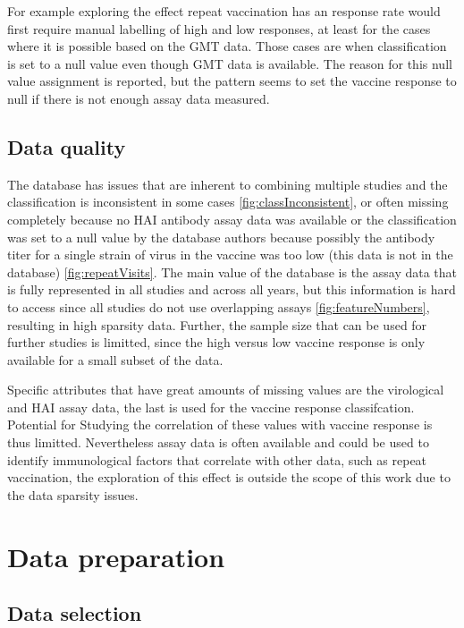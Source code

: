 For example exploring the effect repeat vaccination has an response rate would
first require manual labelling of high and low responses, at least for the
cases where it is possible based on the GMT data. Those cases are when
classification is set to a null value even though GMT data is available.  The
reason for this null value assignment is reported, but the pattern seems to set
the vaccine response to null if there is not enough assay data measured.

\subsection{Data quality}

The database has issues that are inherent to combining multiple studies and the
classification is inconsistent in some cases \autoref{fig:classInconsistent},
or often missing completely because no HAI antibody assay data was available or
the classification was set to a null value by the database authors because
possibly the antibody titer for a single strain of virus in the vaccine was too
low (this data is not in the database) \autoref{fig:repeatVisits}.  The main value of
the database is the assay data that is fully represented in all studies and
across all years, but this information is hard to access since all studies do
not use overlapping assays \autoref{fig:featureNumbers}, resulting in high
sparsity data. Further, the sample size that can be used for further studies is
limitted, since the high versus low vaccine response is only available for a
small subset of the data.

Specific attributes that have great amounts of missing values are the
virological and HAI assay data, the last is used for the vaccine response
classifcation. Potential for Studying the correlation of these values with
vaccine response is thus limitted. Nevertheless assay data is often available
and could be used to identify immunological factors that correlate with other
data, such as repeat vaccination, the exploration of this effect is outside the
scope of this work due to the data sparsity issues.

\section{Data preparation}

\subsection{Data selection}


